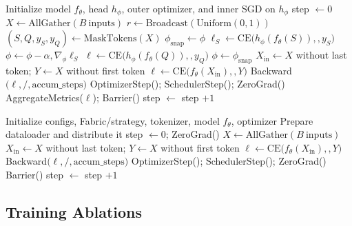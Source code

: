 \begin{algorithm}\small \caption{Distributed SMLMT Loop}\label{alg:dist-maml} \begin{algorithmic} \State Initialize model $f_\theta$, head $h_\phi$, outer optimizer, and inner SGD on $h_\phi$ \State step $\leftarrow 0$  \State $X \leftarrow \text{AllGather}(B\ \text{inputs})$  \State $r \leftarrow \text{Broadcast}(\text{Uniform}(0,1))$  \State $(S,Q,y_S,y_Q) \leftarrow \text{MaskTokens}(X)$ \State $\phi_{\text{snap}} \leftarrow \phi$   \State $\ell_S \leftarrow \text{CE}\big(h_\phi(f_\theta(S)),,y_S\big)$ \State $\phi \leftarrow \phi - \alpha,\nabla_\phi \ell_S$ \EndFor \State $\ell \leftarrow \text{CE}\big(h_\phi(f_\theta(Q)),,y_Q\big)$ \State $\phi \leftarrow \phi_{\text{snap}}$  \Else \State $X_{\text{in}} \leftarrow X$ without last token; $Y \leftarrow X$ without first token \State $\ell \leftarrow \text{CE}\big(f_\theta(X_{\text{in}}),,Y\big)$ \EndIf \State Backward$\big(\ell ,/, \text{accum\_steps}\big)$  \State OptimizerStep(); SchedulerStep(); ZeroGrad() \State AggregateMetrics($\ell$); Barrier() \EndIf \State step $\leftarrow$ step $+ 1$ \EndFor \end{algorithmic} \end{algorithm}

\begin{algorithm}\small \caption{Distributed AR Loop}\label{alg:dist-ar} \begin{algorithmic} \State Initialize configs, Fabric/strategy, tokenizer, model $f_\theta$, optimizer \State Prepare dataloader and distribute it \State step $\leftarrow 0$; ZeroGrad()  \State $X \leftarrow \text{AllGather}(B\ \text{inputs})$  \State $X_{\text{in}} \leftarrow X$ without last token; $Y \leftarrow X$ without first token \State $\ell \leftarrow \text{CE}\big(f_\theta(X_{\text{in}}),,Y\big)$ \State Backward$\big(\ell ,/, \text{accum\_steps}\big)$  \State OptimizerStep(); SchedulerStep(); ZeroGrad() \State Barrier()  \EndIf \State step $\leftarrow$ step $+ 1$ \EndFor \end{algorithmic} \end{algorithm}



\subsection{Training Ablations}


